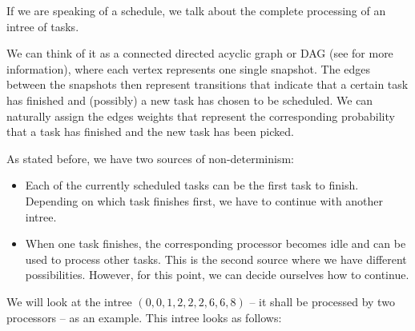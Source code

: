 If we are speaking of a schedule, we talk about the complete processing of an intree of tasks.

We can think of it as a connected directed acyclic graph or DAG (see \cite{diestel2005graph} for more information), where each vertex represents one single snapshot. The edges between the snapshots then represent transitions that indicate that a certain task has finished and (possibly) a new task has chosen to be scheduled. We can naturally assign the edges weights that represent the corresponding probability that a task has finished and the new task has been picked.

As stated before, we have two sources of non-determinism:
\begin{itemize}
\item Each of the currently scheduled tasks can be the first task to finish. Depending on which task finishes first, we have to continue with another intree.
\item When one task finishes, the corresponding processor becomes idle and can be used to process other tasks. This is the second source where we have different possibilities. However, for this point, we can decide ourselves how to continue.
\end{itemize}

We will look at the intree $(0,0,1,2,2,2,6,6,8)$ -- it shall be processed by two processors -- as an example. This intree looks as follows:

\begin{center}
\end{center}


